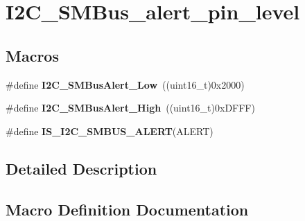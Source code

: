 \hypertarget{group___i2_c___s_m_bus__alert__pin__level}{}\section{I2\+C\+\_\+\+S\+M\+Bus\+\_\+alert\+\_\+pin\+\_\+level}
\label{group___i2_c___s_m_bus__alert__pin__level}
\subsection*{Macros}
\begin{DoxyCompactItemize}
\item 
\hypertarget{group___i2_c___s_m_bus__alert__pin__level_ga6f923166107afb8aad1d7d1a87048d6e}{}\#define {\bfseries I2\+C\+\_\+\+S\+M\+Bus\+Alert\+\_\+\+Low}~((uint16\+\_\+t)0x2000)\label{group___i2_c___s_m_bus__alert__pin__level_ga6f923166107afb8aad1d7d1a87048d6e}

\item 
\hypertarget{group___i2_c___s_m_bus__alert__pin__level_gac3ab64f43ef90f0f83f9c88981aaa862}{}\#define {\bfseries I2\+C\+\_\+\+S\+M\+Bus\+Alert\+\_\+\+High}~((uint16\+\_\+t)0x\+D\+F\+F\+F)\label{group___i2_c___s_m_bus__alert__pin__level_gac3ab64f43ef90f0f83f9c88981aaa862}

\item 
\#define {\bfseries I\+S\+\_\+\+I2\+C\+\_\+\+S\+M\+B\+U\+S\+\_\+\+A\+L\+E\+R\+T}(A\+L\+E\+R\+T)
\end{DoxyCompactItemize}


\subsection{Detailed Description}


\subsection{Macro Definition Documentation}
\hypertarget{group___i2_c___s_m_bus__alert__pin__level_ga61b0c91563eb4bd598329241fe7d3bb4}{}

